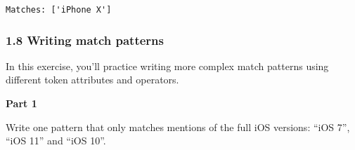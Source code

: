 \documentclass[11pt]{article}
\begin{document}
    \begin{Verbatim}[commandchars=\\\{\}]
Matches: ['iPhone X']

    \end{Verbatim}

    \hypertarget{writing-match-patterns}{%
\subsubsection{1.8 Writing match
patterns}\label{writing-match-patterns}}

In this exercise, you'll practice writing more complex match patterns
using different token attributes and operators.

\textbf{Part 1}

Write one pattern that only matches mentions of the full iOS versions:
``iOS 7'', ``iOS 11'' and ``iOS 10''.
\end{document}
